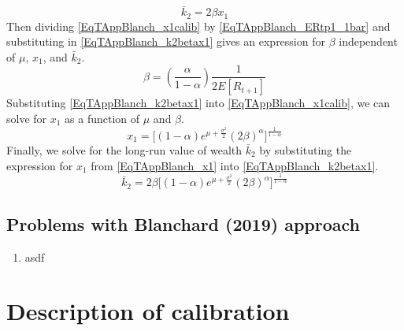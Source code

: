 \documentclass[letterpaper,12pt]{article}
\theoremstyle{definition}
\begin{document}
    \begin{equation}\label{EqTAppBlanch_k2betax1}
      \bar{k}_2 = 2\beta x_1
    \end{equation}
    Then dividing \eqref{EqTAppBlanch_x1calib} by \eqref{EqTAppBlanch_ERtp1_1bar} and substituting in \eqref{EqTAppBlanch_k2betax1} gives an expression for $\beta$ independent of $\mu$, $x_1$, and $\bar{k}_2$.
    \begin{equation}\label{EqTAppBlanch_beta}
      \beta = \left(\frac{\alpha}{1-\alpha}\right)\frac{1}{2 E[R_{t+1}]}
    \end{equation}
    Substituting \eqref{EqTAppBlanch_k2betax1} into \eqref{EqTAppBlanch_x1calib}, we can solve for $x_1$ as a function of $\mu$ and $\beta$.
    \begin{equation}\label{EqTAppBlanch_x1}
      x_1 = \Big[(1-\alpha)e^{\mu + \frac{\sigma^2}{2}}(2\beta)^\alpha\Bigr]^\frac{1}{1-\alpha}
    \end{equation}
    Finally, we solve for the long-run value of wealth $\bar{k}_2$ by substituting the expression for $x_1$ from \eqref{EqTAppBlanch_x1} into \eqref{EqTAppBlanch_k2betax1}.
    \begin{equation}\label{EqTAppBlanch_k2barfinal}
      \bar{k}_2 = 2\beta\Big[(1-\alpha)e^{\mu + \frac{\sigma^2}{2}}(2\beta)^\alpha\Bigr]^\frac{1}{1-\alpha}
    \end{equation}


  \subsection{Problems with Blanchard (2019) approach}\label{SecTAppBlanch_Probs}

    \begin{enumerate}
      \item asdf
    \end{enumerate}


\newpage
\setcounter{equation}{0}                         %
\section{Description of calibration}\label{SecTAppCalib}
\end{document}
